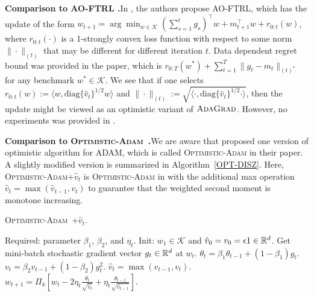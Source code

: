 \documentclass[11pt]{article}
\def\K{\mathcal{K}}
\theoremstyle{k}
\begin{document}
\textbf{Comparison to AO-FTRL \cite{MY16}.}\hspace{0.1in}In \cite{MY16}, the authors propose AO-FTRL, which has the update of 
the form $w_{t+1} = \arg\min_{{w \in \K}} ( \sum_{s=1}^t g_s )^{\top}  w + m_{t+1}^\top w + r_{0:t}(w) $, where $r_{0:t}(\cdot)$ is a 1-strongly convex loss function with respect to some norm $\| \cdot\|_{(t)}$ that may be different for different iteration $t$. 
Data dependent regret bound was provided in the paper, which is $r_{{0:T}}(w^*) + \sum_{t=1}^T \| g_t - m_t \|_{(t)^*}$ for any benchmark $w^{*} \in \K$. We see that if
one selects $r_{0:t}(w) := \langle w, \text{diag}\{\hat{v}_t\}^{1/2} w \rangle$ 
and $\| \cdot \|_{(t)}:= 
\sqrt{ \langle \cdot, \text{diag}\{\hat{v}_t\}^{1/2} \cdot \rangle }$, then the update might be viewed as an optimistic variant of $\textsc{AdaGrad}$. However, no experiments was provided in \cite{MY16}. 


\textbf{Comparison to \textsc{Optimistic-Adam}~\cite{DISZ18}.}\hspace{0.1in}We are aware that \cite{DISZ18} proposed one version of optimistic algorithm for ADAM, which
is called \textsc{Optimistic-Adam} in their paper. A slightly modified version is summarized in Algorithm~\ref{OPT-DISZ}. Here, \textsc{Optimistic-Adam$+\hat{v}_t$} is \textsc{Optimistic-Adam} in \cite{DISZ18} with the additional max operation $\hat{v}_t = \max ( \hat{v}_{t-1}, v_t)$ to guarantee that the weighted second moment is monotone increasing.

\begin{algorithm}[h]
\begin{algorithmic}[1]
\caption{\textsc{Optimistic-Adam~\cite{DISZ18}+$\hat{v}_t$}. \label{OPT-DISZ}}
\STATE Required: parameter $\beta_1$, $\beta_2$, and $\eta_t$.
\STATE Init: $w_1 \in \K$ and $\hat{v}_0 = v_{0} = \epsilon 1 \in \mathbb{R}^{d}$.
\STATE Get mini-batch stochastic gradient vector $g_t \in \mathbb{R}^d$ at $w_t$.
\STATE $\theta_t = \beta_{1} \theta_{t-1} + (1 - \beta_{1}) g_t$.
\STATE $v_t = \beta_2 v_{t-1} + (1 - \beta_2) g_t^2$.
\STATE $\hat{v}_t = \max( \hat{v}_{t-1} , v_t )$.
\STATE $w_{t+1} = \Pi_{k}[ w_{t} - 2 \eta_t \frac{\theta_t}{ \sqrt{\hat{v}_t }}
+ \eta_t \frac{\theta_{t-1}}{ \sqrt{\hat{v}_{t-1}} }]$.
\ENDFOR
\end{algorithmic}
\end{algorithm}
\end{document}
